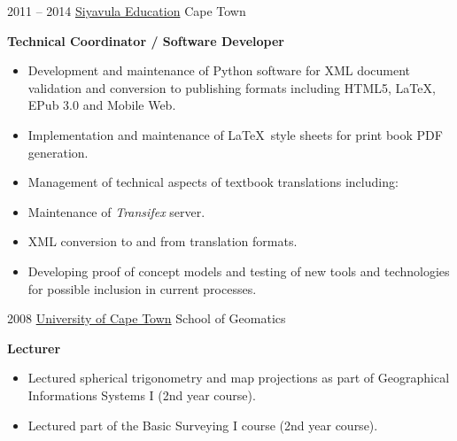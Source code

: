 \documentclass[]{friggeri-cv} %
\begin{document}
\begin{entrylist}
\entry
{2011 -- 2014 }
{\href{http://www.siyavula.com}{Siyavula Education}}
{Cape Town}
{%
\textbf{Technical Coordinator / Software Developer}
\begin{itemize}
\setlength{\itemsep}{5pt}
\item Development and maintenance of Python software for XML document validation and conversion to publishing formats including HTML5, \LaTeX, EPub 3.0 and Mobile Web.
\item Implementation and maintenance of \LaTeX~style sheets for print book PDF generation. %

\item Management of technical aspects of textbook translations including:
    \item Maintenance of \emph{Transifex} server.
    \item XML conversion to and from translation formats.

\item Developing proof of concept models and testing of new tools and technologies for possible inclusion in current processes.


\end{itemize}
}
%
\end{entrylist}
\begin{entrylist}
\entry
{2008}
{\href{http://www.uct.ac.za}{University of Cape Town}}
{School of Geomatics}
{%
\textbf{Lecturer}
\begin{itemize}
\setlength{\itemsep}{5pt}
    \item Lectured spherical trigonometry and map projections as part of Geographical Informations Systems I (2nd year course).
    \item Lectured part of the Basic Surveying I course (2nd year course).
\end{itemize}
}
\end{entrylist}
\end{document}
